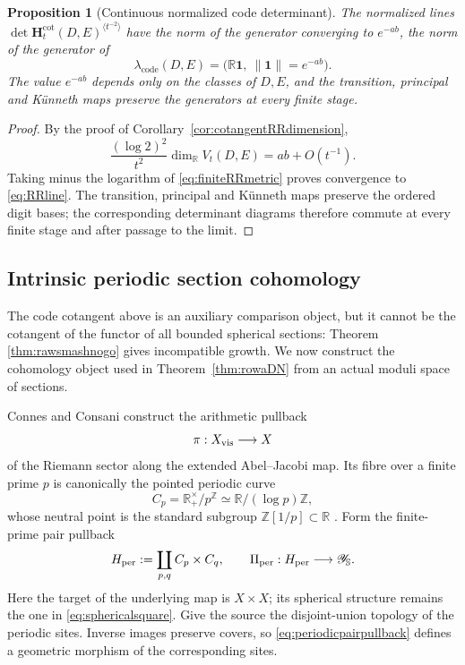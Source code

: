 \documentclass[11pt]{amsart}
\newtheorem{proposition}[theorem]{Proposition}
\theoremstyle{definition}
\theoremstyle{remark}
\newcommand{\R}{\mathbb R}
\newcommand{\Z}{\mathbb Z}
\begin{document}
\begin{proposition}[Continuous normalized code determinant]
\label{prop:continuousRRdet}
The normalized lines
$\det\mathbf H_t^{\mathrm{cot}}(D,E)^{\langle t^{-2}\rangle}$ have the
norm of the generator converging to $e^{-ab}$, the norm of the generator of
\begin{equation}\label{eq:RRline}
 \lambda_{\mathrm{code}}(D,E)
   =\bigl(\R\mathbf1,\ \|\mathbf1\|=e^{-ab}\bigr).
\end{equation}
The value $e^{-ab}$ depends only on the classes of $D,E$, and the
transition, principal and K\"unneth maps preserve the generators at every
finite stage.
\end{proposition}

\begin{proof}
By the proof of Corollary~\ref{cor:cotangentRRdimension},
\[
 \frac{(\log2)^2}{t^2}\dim_{\R}V_t(D,E)=ab+O(t^{-1}).
\]
Taking minus the logarithm of \eqref{eq:finiteRRmetric} proves convergence
to \eqref{eq:RRline}.  The transition, principal and K\"unneth maps preserve
the ordered digit bases; the corresponding determinant diagrams therefore
commute at every finite stage and after passage to the limit.
\end{proof}


\subsection{Intrinsic periodic section cohomology}
\label{subsec:intrinsicperiodic}

The code cotangent above is an auxiliary comparison object, but it cannot be the
cotangent of the functor of all bounded spherical sections: Theorem
\ref{thm:rawsmashnogo} gives incompatible growth.  We now construct the
cohomology object used in Theorem~\ref{thm:rowaDN} from an actual moduli space of
sections.

Connes and Consani construct the arithmetic pullback
\[
 \pi:X_{\rm vis}\longrightarrow X
\]
of the Riemann sector along the extended Abel--Jacobi map.  Its fibre over a
finite prime $p$ is canonically the pointed periodic curve
\begin{equation}\label{eq:periodicfiber}
 C_p=\R_+^\times/p^\Z\simeq\R/(\log p)\Z,
\end{equation}
whose neutral point is the standard subgroup $\Z[1/p]\subset\R$
\cite[\S6.3]{CCJacobian}.  Form the finite-prime pair pullback
\begin{equation}\label{eq:periodicpairpullback}
 H_{\rm per}:=\coprod_{p,q}C_p\times C_q,
 \qquad
 \Pi_{\rm per}:H_{\rm per}\longrightarrow\mathscr Y_{\mathbb S}.
\end{equation}
Here the target of the underlying map is $X\times X$; its spherical
structure remains the one in \eqref{eq:sphericalsquare}.  Give the source
the disjoint-union topology of the periodic sites.  Inverse images preserve
covers, so \eqref{eq:periodicpairpullback} defines a geometric morphism of
the corresponding sites.
\end{document}
